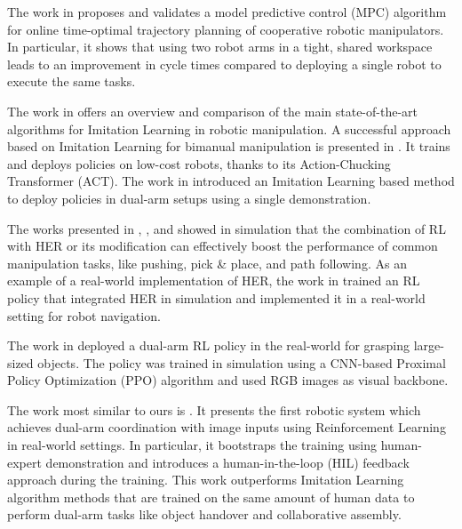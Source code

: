 \documentclass[letterpaper, 10 pt, conference]{ieeeconf}  %
\begin{document}
The work in \cite{10322775} proposes and validates a model predictive control (MPC) algorithm for online time-optimal trajectory planning of cooperative robotic manipulators. %
In particular, it shows that using two robot arms in a tight, shared workspace leads to an improvement in cycle times compared to deploying a single robot to execute the same tasks. 

The work in \cite{lin2023bitouchbimanualtactilemanipulation} offers an overview and comparison of the main state-of-the-art algorithms for Imitation Learning in robotic manipulation. 
A successful approach based on Imitation Learning for bimanual manipulation is presented in \cite{zhao2023learningfinegrainedbimanualmanipulation}. It trains and deploys policies on low-cost robots, thanks to its Action-Chucking Transformer (ACT). The work in \cite{wang2025oneshotdualarmimitationlearning} introduced an Imitation Learning based method to deploy policies in dual-arm setups using a single demonstration.

The works presented in \cite{huang2024mrhermodelbasedrelayhindsight}, \cite{makarova2025contherhumanlikecontextualrobot}, and \cite{Horv_th_2024} showed in simulation that the combination of RL with HER or its modification can effectively boost the performance of common manipulation tasks, like pushing, pick \& place, and path following. 
As an example of a real-world implementation of HER, the work in \cite{wang2025maernavbidirectionalmotionlearning} trained an RL policy that integrated HER in simulation and implemented it in a real-world setting for robot navigation.

The work in \cite{wang2025learningdualarmcoordinationgrasping} deployed a dual-arm RL policy in the real-world for grasping large-sized objects. The policy was trained in simulation using a CNN-based Proximal Policy Optimization (PPO) algorithm \cite{schulman2017proximalpolicyoptimizationalgorithms} and used RGB images as visual backbone.

The work most similar to ours is \cite{luo2024precisedexterousroboticmanipulation}. It presents the first robotic system which achieves dual-arm coordination with image inputs using Reinforcement Learning in real-world settings. 
In particular, it bootstraps the training using human-expert demonstration and introduces a human-in-the-loop (HIL) feedback approach during the training. 
This work outperforms Imitation Learning algorithm methods that are trained on the same amount of human data to perform dual-arm tasks like object handover and collaborative assembly.
\end{document}
